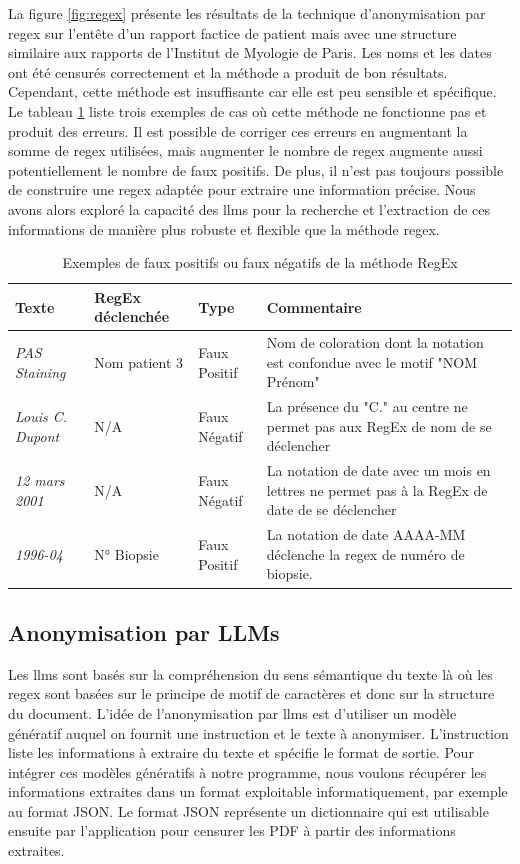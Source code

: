 La figure \ref{fig:regex} présente les résultats de la technique d'anonymisation par \gls{regex} sur l'entête d'un rapport factice de patient mais avec une structure similaire aux rapports de l'Institut de Myologie de Paris. Les noms et les dates ont été censurés correctement et la méthode a produit de bon résultats. Cependant, cette méthode est insuffisante car elle est peu sensible et spécifique. Le tableau \ref{tab:regex_fail} liste trois exemples de cas où cette méthode ne fonctionne pas et produit des erreurs. Il est possible de corriger ces erreurs en augmentant la somme de \gls{regex} utilisées, mais augmenter le nombre de \gls{regex} augmente aussi potentiellement le nombre de faux positifs. De plus, il n'est pas toujours possible de construire une \gls{regex} adaptée pour extraire une information précise. Nous avons alors exploré la capacité des \gls{llms} pour la recherche et l'extraction de ces informations de manière plus robuste et flexible que la méthode \gls{regex}.
\begin{table}[!ht]
\centering
\caption{Exemples de faux positifs ou faux négatifs de la méthode RegEx}
\label{tab:regex_fail}
\begin{tabularx}{\textwidth}{|l|l|l|X|}
\hline
\textbf{Texte} & \textbf{RegEx déclenchée} & \textbf{Type} & \textbf{Commentaire} \\ \hline
\textit{PAS Staining} & Nom patient 3 & Faux Positif & Nom de coloration dont la notation est confondue avec le motif "NOM Prénom" \\ \hline
\textit{Louis C. Dupont} & N/A & Faux Négatif & La présence du "C." au centre ne permet pas aux RegEx de nom de se déclencher \\ \hline
\textit{12 mars 2001} & N/A & Faux Négatif & La notation de date avec un mois en lettres ne permet pas à la RegEx de date de se déclencher \\ \hline
\textit{1996-04} & N° Biopsie & Faux Positif & La notation de date AAAA-MM déclenche la \gls{regex} de numéro de biopsie. \\ \hline
\end{tabularx}
\end{table}

\subsection{Anonymisation par LLMs}
Les \gls{llms} sont basés sur la compréhension du sens sémantique du texte là où les \gls{regex} sont basées sur le principe de motif de caractères et donc sur la structure du document. L'idée de l'anonymisation par \gls{llms} est d'utiliser un modèle génératif auquel on fournit une instruction et le texte à anonymiser. L'instruction liste les informations à extraire du texte et spécifie le format de sortie. Pour intégrer ces modèles génératifs à notre programme, nous voulons récupérer les informations extraites dans un format exploitable informatiquement, par exemple au format JSON. Le format JSON représente un dictionnaire qui est utilisable ensuite par l'application pour censurer les PDF à partir des informations extraites.

